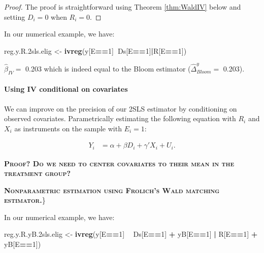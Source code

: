 \documentclass[]{book}
\newenvironment{Shaded}{\begin{snugshade}}{\end{snugshade}}
\newcommand{\KeywordTok}[1]{\textcolor[rgb]{0.13,0.29,0.53}{\textbf{#1}}}
\newcommand{\DecValTok}[1]{\textcolor[rgb]{0.00,0.00,0.81}{#1}}
\newcommand{\StringTok}[1]{\textcolor[rgb]{0.31,0.60,0.02}{#1}}
\newcommand{\OperatorTok}[1]{\textcolor[rgb]{0.81,0.36,0.00}{\textbf{#1}}}
\newcommand{\NormalTok}[1]{#1}
\let\oldparagraph\paragraph
\renewcommand{\paragraph}[1]{\oldparagraph{#1}\mbox{}}
\theoremstyle{definition}
\theoremstyle{definition}
\theoremstyle{definition}
\theoremstyle{remark}
\let\BeginKnitrBlock\begin \let\EndKnitrBlock\end
\begin{document}
\BeginKnitrBlock{proof}
\iffalse{} {Proof. } \fi{}The proof is straightforward using Theorem
\ref{thm:WaldIV} below and setting \(D_i=0\) when \(R_i=0\).
\EndKnitrBlock{proof}

\BeginKnitrBlock{example}
\protect\hypertarget{exm:unnamed-chunk-99}{}{\label{exm:unnamed-chunk-99}
}In our numerical example, we have:
\EndKnitrBlock{example}

\begin{Shaded}
\begin{Highlighting}[]
\NormalTok{reg.y.R.2sls.elig <-}\StringTok{ }\KeywordTok{ivreg}\NormalTok{(y[E}\OperatorTok{==}\DecValTok{1}\NormalTok{]}\OperatorTok{~}\NormalTok{Ds[E}\OperatorTok{==}\DecValTok{1}\NormalTok{]}\OperatorTok{|}\NormalTok{R[E}\OperatorTok{==}\DecValTok{1}\NormalTok{])}
\end{Highlighting}
\end{Shaded}

\(\hat{\beta}_{IV}=\) 0.203 which is indeed equal to the Bloom estimator
(\(\hat{\Delta}^y_{Bloom}=\) 0.203).

\paragraph{Using IV conditional on
covariates}\label{using-iv-conditional-on-covariates}

We can improve on the precision of our 2SLS estimator by conditioning on
observed covariates. Parametrically estimating the following equation
with \(R_i\) and \(X_i\) as instruments on the sample with \(E_i=1\):

\begin{align*}
    Y_i &  = \alpha +  \beta D_i + \gamma' X_i + U_i.
\end{align*}

\textbf{\textsc{Proof? Do we need to center covariates to their mean in
the treatment group?}}

\textbf{\textsc{Nonparametric estimation using Frolich's Wald matching
estimator.}}\}

\BeginKnitrBlock{example}
\protect\hypertarget{exm:unnamed-chunk-100}{}{\label{exm:unnamed-chunk-100}
}In our numerical example, we have:
\EndKnitrBlock{example}

\begin{Shaded}
\begin{Highlighting}[]
\NormalTok{reg.y.R.yB.2sls.elig <-}\StringTok{ }\KeywordTok{ivreg}\NormalTok{(y[E}\OperatorTok{==}\DecValTok{1}\NormalTok{] }\OperatorTok{~}\StringTok{ }\NormalTok{Ds[E}\OperatorTok{==}\DecValTok{1}\NormalTok{] }\OperatorTok{+}\StringTok{ }\NormalTok{yB[E}\OperatorTok{==}\DecValTok{1}\NormalTok{] }\OperatorTok{|}\StringTok{ }\NormalTok{R[E}\OperatorTok{==}\DecValTok{1}\NormalTok{] }\OperatorTok{+}\StringTok{ }\NormalTok{yB[E}\OperatorTok{==}\DecValTok{1}\NormalTok{])}
\end{Highlighting}
\end{Shaded}
\end{document}
